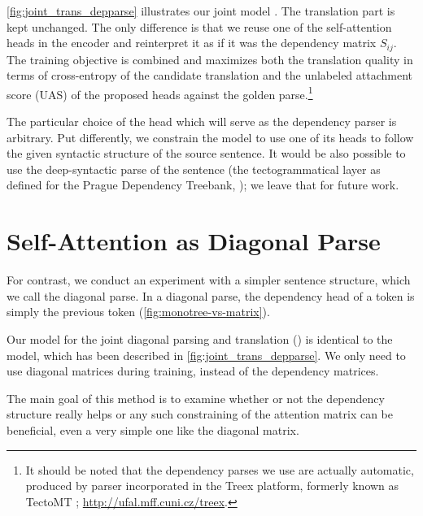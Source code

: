 \cref{fig:joint_trans_depparse} illustrates our joint model \DepParse. The translation
part is kept unchanged. The only difference is that we reuse one of the
self-attention heads in the \transformer encoder and reinterpret it as if it was
the dependency matrix $S_{ij}$.
The training objective is combined and
maximizes both the translation quality in terms of cross-entropy of the
candidate translation and the unlabeled attachment score (UAS) of the proposed
heads against the golden parse.\footnote{It should be noted that the dependency
parses we use are actually automatic, produced by
 parser incorporated in the Treex
platform, formerly known as TectoMT ;
\url{http://ufal.mff.cuni.cz/treex}.}

The particular choice of the head which will serve as the dependency parser is
arbitrary. Put differently, we constrain the \transformer model to use one of its
heads to follow the given syntactic structure of the source sentence. It would be also
possible to use the deep-syntactic parse of the sentence (the
tectogrammatical layer as defined for the Prague Dependency Treebank,
); we leave that for future work.

\section{Self-Attention as Diagonal Parse}
\label{multitask-diagonal}

For contrast, we conduct an experiment with a simpler sentence structure, which we call the diagonal parse. In a diagonal parse, the dependency head of a token is simply the previous token (\cref{fig:monotree-vs-matrix}).

Our model for the joint diagonal parsing and translation (\DiagonalParse) is identical to the \DepParse model, which has been described in \cref{fig:joint_trans_depparse}.
We only need to use diagonal matrices during training, instead of the dependency matrices.

The main goal of this method is to examine whether or not the dependency structure really helps or any such constraining of the attention matrix can be beneficial, even a very simple one like the diagonal matrix. 

